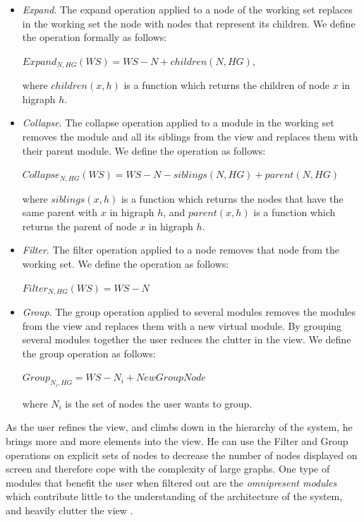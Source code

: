 \documentclass[preprint,12pt]{elsarticle}
\begin{document}
\begin{itemize}

\item {\em Expand}. The expand operation applied to a node of the working set replaces in the working set the node with nodes that represent its children. We define the operation formally as follows: 

$ Expand_{N,HG} (WS) = WS - N + children (N, HG)$, 

where $children(x,h)$ is a function which returns the children of node $x$ in higraph $h$.

\item {\em Collapse}. The collapse operation applied to a module in the working set removes the module and all its siblings from the view and replaces them with their parent module. We define the operation as follows:

$ Collapse_{N,HG} (WS) = WS - N - siblings (N, HG) + parent (N, HG)$

where $siblings(x,h)$ is a function which returns the nodes that have the same parent with $x$ in higraph $h$, and $parent(x,h)$ is a function which returns the parent of node $x$ in higraph $h$. 

\item {\em Filter}. The filter operation applied to a node removes that node from the working set. We define the operation as follows:

$ Filter_{N,HG} (WS) = WS - N$

\item {\em Group}. The group operation applied to several modules removes the modules from the view and replaces them with a new virtual module. By grouping several modules together the user reduces the clutter in the view. We define the group operation as follows: 

$ Group_{N_{i},HG} = WS - N_i + NewGroupNode $

where $N_i$ is the set of nodes the user wants to group.

\end{itemize}

As the user refines the view, and climbs down in the hierarchy of the system, he brings more and more elements into the view. He can use the Filter and Group operations on explicit sets of nodes to decrease the number of nodes displayed on screen and therefore cope with the complexity of large graphs. One type of modules that benefit the user when filtered out are the {\em omnipresent modules} which contribute little to the understanding of the architecture of the system, and heavily clutter the view \cite{mitchell-bunch}.
\end{document}
